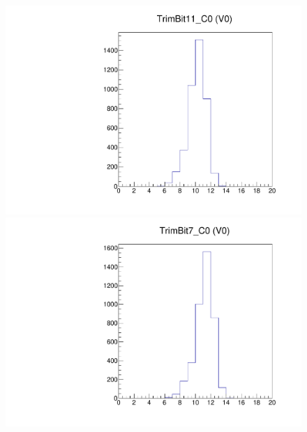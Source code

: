 \begin{figure}[!Hp]
\centering
\begin{minipage}{0.45\textwidth}
  \includegraphics[width=1.0\textwidth]{figures/trim_TrimBit11.pdf}
  \caption{}
  \label{fig:trim_TrimBit11}
\end{minipage}
\hspace{0.3cm}
\begin{minipage}{0.45\textwidth}
  \includegraphics[width=1.0\textwidth]{figures/trim_TrimBit7.pdf}
  \caption{}
  \label{fig:trim_TrimBit7}
\end{minipage}
\end{figure}
